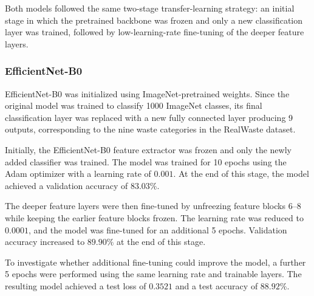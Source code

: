\documentclass[12pt,a4paper]{article}
\begin{document}
Both models followed the same two-stage transfer-learning strategy: an
initial stage in which the pretrained backbone was frozen and only a new
classification layer was trained, followed by low-learning-rate
fine-tuning of the deeper feature layers.

\subsubsection{EfficientNet-B0}

EfficientNet-B0 was initialized using ImageNet-pretrained weights. Since
the original model was trained to classify 1000 ImageNet classes, its
final classification layer was replaced with a new fully connected layer
producing 9 outputs, corresponding to the nine waste categories in the
RealWaste dataset.

Initially, the EfficientNet-B0 feature extractor was frozen and only the
newly added classifier was trained. The model was trained for 10 epochs
using the Adam optimizer with a learning rate of $0.001$. At the end of
this stage, the model achieved a validation accuracy of $83.03\%$.

The deeper feature layers were then fine-tuned by unfreezing feature
blocks 6--8 while keeping the earlier feature blocks frozen. The learning
rate was reduced to $0.0001$, and the model was fine-tuned for an
additional 5 epochs. Validation accuracy increased to $89.90\%$ at the end
of this stage.

To investigate whether additional fine-tuning could improve the model, a
further 5 epochs were performed using the same learning rate and
trainable layers. The resulting model achieved a test loss of $0.3521$
and a test accuracy of $88.92\%$.
\end{document}

